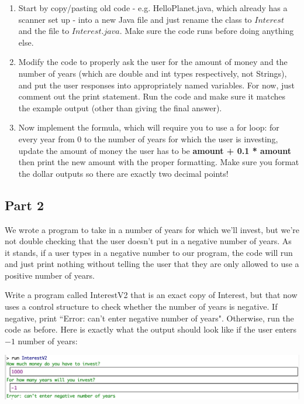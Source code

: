 \documentclass[answers,addpoints]{exam} %
\begin{document}
\begin{questions}
\begin{enumerate}

\item Start by copy/pasting old code - e.g. HelloPlanet.java, which already has a scanner set up - into a new Java file and just rename the class to $Interest$ and the file to $Interest.java$. Make sure the code runs before doing anything else. 

\item Modify the code to properly ask the user for the amount of money and the number of years (which are double and int types respectively, not Strings), and put the user responses into appropriately named variables. For now, just comment out the print statement. Run the code and make sure it matches the example output (other than giving the final answer). 

\item Now implement the formula, which will require you to use a for loop: for every year from 0 to the number of years for which the user is investing, update the amount of money the user has to be \textbf{amount + 0.1 * amount} then print the new amount with the proper formatting. Make sure you format the dollar outputs so there are exactly two decimal points!
\end{enumerate}

\subsection{Part 2}

We wrote a program to take in a number of years for which we'll invest, but we're not double checking that the user doesn't put in a negative number of years. As it stands, if a user types in a negative number to our program, the code will run and just print nothing without telling the user that they are only allowed to use a positive number of years.

Write a program called InterestV2 that is an exact copy of Interest, but that now uses a control structure to check whether the number of years is negative. If negative, print ``Error: can't enter negative number of years". Otherwise, run the code as before. Here is exactly what the output should look like if the user enters $-1$ number of years:

\includegraphics{interestExampleError}


\end{questions}
\end{document}
